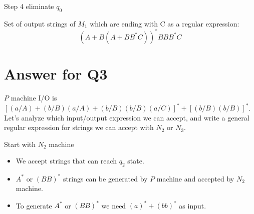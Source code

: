 \documentclass[12pt]{article}
\begin{document}
Step 4 eliminate $q_0$

\begin{center}
\end{center}

Set of output strings of $M_1$ which are ending
with C as a regular expression: $$(A+B(A+BB^*C))^*BBB^*C$$


\section*{Answer for Q3}
$P$ machine I/O is $[(a/A) + (b/B)(a/A) + (b/B)(b/B)(a/C)]^* + [(b/B)(b/B)]^*$. Let's analyze which input/output expression we can accept, and write a general regular expression for strings we can accept with $N_2$ or $N_3$.

Start with $N_2$ machine
\begin{itemize}
    \item We accept strings that can reach $q_2$ state. 
    \item $A^* $ or $ (BB)^*$ strings can be generated by $P$ machine and accepted by $N_2$ machine. 
    \item To generate $A^* $ or $ (BB)^*$ we need $(a)^* + (bb)^*$ as input. 
\end{itemize}
\end{document}
